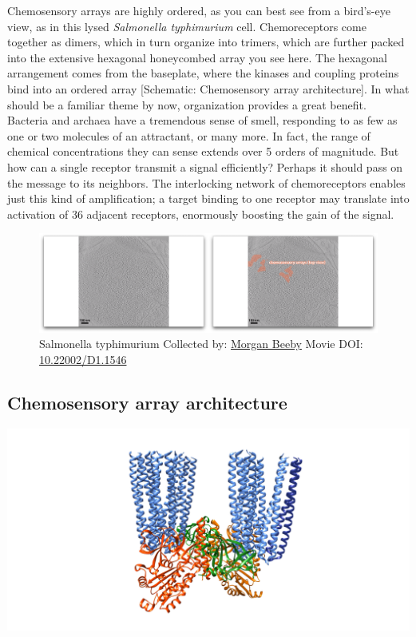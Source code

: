 \documentclass[]{tufte-book}
\begin{document}
Chemosensory arrays are highly ordered, as you can best see from a
bird's-eye view, as in this lysed \emph{Salmonella typhimurium} cell.
Chemoreceptors come together as dimers, which in turn organize into
trimers, which are further packed into the extensive hexagonal
honeycombed array you see here. The hexagonal arrangement comes from the
baseplate, where the kinases and coupling proteins bind into an ordered
array {[}Schematic: Chemosensory array architecture{]}. In what should
be a familiar theme by now, organization provides a great benefit.
Bacteria and archaea have a tremendous sense of smell, responding to as
few as one or two molecules of an attractant, or many more. In fact, the
range of chemical concentrations they can sense extends over 5 orders of
magnitude. But how can a single receptor transmit a signal efficiently?
Perhaps it should pass on the message to its neighbors. The interlocking
network of chemoreceptors enables just this kind of amplification; a
target binding to one receptor may translate into activation of 36
adjacent receptors, enormously boosting the gain of the signal.





\begin{figure}
\includegraphics{movie_stills/7_2} \caption[Salmonella typhimurium Collected by:
\protect\hyperlink{morgan_beeby}{Morgan Beeby} Movie DOI:
\href{https://doi.org/10.22002/D1.1546}{10.22002/D1.1546}]{Salmonella typhimurium Collected by:
\protect\hyperlink{morgan_beeby}{Morgan Beeby} Movie DOI:
\href{https://doi.org/10.22002/D1.1546}{10.22002/D1.1546}}\label{fig:7-2}
\end{figure}

\subsection{Chemosensory array
architecture}\label{Chemosensory_array_architecture}

\includegraphics{img/schematics/7_2_1}
\end{document}
